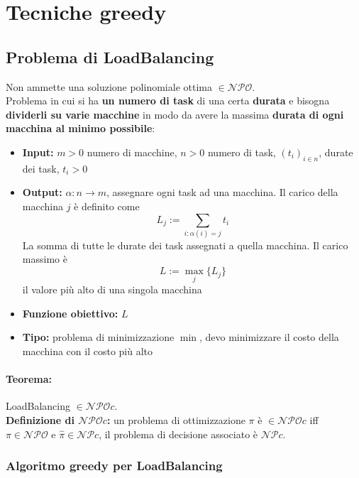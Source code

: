 \section{Tecniche greedy}

\subsection{Problema di LoadBalancing}
Non ammette una soluzione polinomiale ottima $\in \mathcal{NPO}$.\\

Problema in cui si ha \textbf{un numero di task} di una certa \textbf{durata} e bisogna \textbf{dividerli su varie macchine} in modo da avere la massima \textbf{durata di ogni macchina al minimo possibile}:
\begin{itemize}
	\item \textbf{Input:} $m > 0$ numero di macchine, $n>0$ numero di task, $(t_i)_{i \in n}$, durate dei task, $t_i > 0$
	
	\item \textbf{Output:} $\alpha: n \rightarrow m$, assegnare ogni task ad una macchina. Il carico della macchina $j$ è definito come 
	$$ L_j := \sum_{i: \alpha (i) = j} t_i$$
	La somma di tutte le durate dei task assegnati a quella macchina. Il carico massimo è
	$$ L := \max_j \{L_j\}$$ 
	il valore più alto di una singola macchina
	
	\item \textbf{Funzione obiettivo:} $L$
	
	\item \textbf{Tipo:} problema di minimizzazione $\min$, devo minimizzare il costo della macchina con il costo più alto
\end{itemize}

\paragraph{Teorema:} LoadBalancing $\in \mathcal{NPO}c$.\\

\textbf{Definizione di $\mathcal{NPO}c$:} un problema di ottimizzazione $\pi$ è $\in \mathcal{NPO}c$ iff $\pi \in \mathcal{NPO}$ e $\hat{\pi} \in \mathcal{NP}c$, il problema di decisione associato è $\mathcal{NP}c$.\\

\newpage

\subsubsection{Algoritmo greedy per LoadBalancing}

